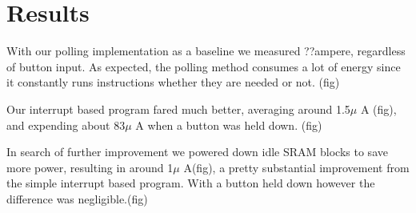 \chapter{Results}

With our polling implementation as a baseline we measured ??ampere, regardless of button input. As expected, the polling method consumes a lot of energy since it constantly runs instructions whether they are needed or not. (fig)

Our interrupt based program fared much better, averaging around 1.5$\mu$ A (fig), and expending about 83$\mu$ A when a button was held down. (fig)

In search of further improvement we powered down idle SRAM blocks to save more power, resulting in around 1$\mu$ A(fig), a pretty substantial improvement from the simple interrupt based program. With a button held down however the difference was negligible.(fig)
